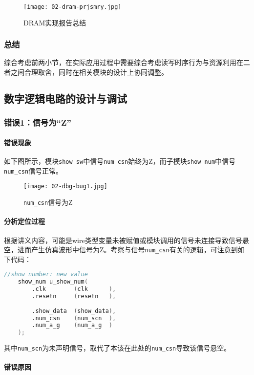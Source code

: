 \documentclass[UTF-8,twoside,c5size]{ctexart}
\begin{document}
	\begin{figure}[!h]
		\centering
		\texttt{[image: 02-dram-prjsmry.jpg]}
		\caption{DRAM实现报告总结}
		\label{dram-prjsmry}
	\end{figure}

	\subsubsection{总结}
	综合考虑前两小节，在实际应用过程中需要综合考虑读写时序行为与资源利用在二者之间合理取舍，同时在相关模块的设计上协同调整。
	
	\subsection{数字逻辑电路的设计与调试}
	\subsubsection{错误1：信号为“Z”}
	\paragraph{错误现象}\hfill
	
	如下图所示，模块\texttt{show\_sw}中信号\texttt{num\_csn}始终为Z，而子模块\texttt{show\_num}中信号\texttt{num\_csn}信号正常。
	\begin{figure}[!h]
		\centering
		\texttt{[image: 02-dbg-bug1.jpg]}
		\caption{\texttt{num\_csn}信号为Z}
	\end{figure}
	
	\paragraph{分析定位过程}\hfill
	
	根据讲义内容，可能是wire类型变量未被赋值或模块调用的信号未连接导致信号悬空，进而产生仿真波形中信号为Z。考察与信号\texttt{num\_csn}有关的逻辑，可注意到如下代码：
	\begin{lstlisting}[language=verilog]
	//show number: new value
	show_num u_show_num(
		.clk        (clk      ),
		.resetn     (resetn   ),
	
		.show_data  (show_data),
		.num_csn    (num_scn  ),
		.num_a_g    (num_a_g  )
	);
	\end{lstlisting}
	其中\texttt{num\_scn}为未声明信号，取代了本该在此处的\texttt{num\_csn}导致该信号悬空。
	\paragraph{错误原因}\hfill
	
\end{document}
